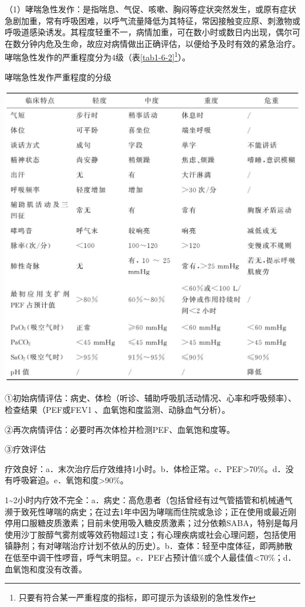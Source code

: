 （1）哮喘急性发作：是指喘息、气促、咳嗽、胸闷等症状突然发生，或原有症状急剧加重，常有呼吸困难，以呼气流量降低为其特征，常因接触变应原、刺激物或呼吸道感染诱发。其程度轻重不一，病情加重，可在数小时或数日内出现，偶尔可在数分钟内危及生命，故应对病情做出正确评估，以便给予及时有效的紧急治疗。哮喘急性发作的严重程度分为4级（表\ref{tab1-6-2}\footnote{只要有符合某一严重程度的指标，即可提示为该级别的急性发作}）。

\begin{table}[!htbp]
  \centering
  \caption{哮喘急性发作严重程度的分级}
  \label{tab1-6-2}
\includegraphics{./images/Image00010.jpg}
\end{table}



①初始病情评估：病史、体检（听诊、辅助呼吸肌活动情况、心率和呼吸频率）、检查结果（PEF或FEV{1}
、血氧饱和度监测、动脉血气分析）。

②再次病情评估：必要时再次体检并检测PEF、血氧饱和度等。

③疗效评估

疗效良好：a．末次治疗后疗效维持1小时。b．体检正常。c．PEF\textgreater{}70\%。d．没有呼吸窘迫。e．氧饱和度\textgreater{}90\%。

1\textasciitilde{}2小时内疗效不完全：a．病史：高危患者（包括曾经有过气管插管和机械通气濒于致死性哮喘的病史；在过去1年中因为哮喘而住院或急诊；正在使用或最近刚停用口服糖皮质激素；目前未使用吸入糖皮质激素；过分依赖SABA，特别是每月使用沙丁胺醇气雾剂或等效药物超过1支；有心理疾病或社会心理问题，包括使用镇静剂；有对哮喘治疗计划不依从的历史）。b．查体：轻至中度体征，即两肺散在低至中调干性啰音，呼气末明显。c．PEF占预计值\%或个人最佳值\textless{}70\%；d．血氧饱和度没有改善。


